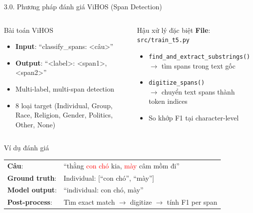 \documentclass[11pt, aspectratio=169]{beamer}
\begin{document}
\begin{frame}[shrink=8]{3.0. Phương pháp đánh giá ViHOS (Span Detection)}

\begin{columns}[T]
  \begin{block}{Bài toán ViHOS}
    \begin{itemize}
      \item \textbf{Input}: ``classify\_spans: <câu>''
      \item \textbf{Output}: ``<label>: <span1>, <span2>''
      \item Multi-label, multi-span detection
      \item 8 loại target (Individual, Group, Race, Religion, Gender, Politics, Other, None)
    \end{itemize}
  \end{block}

  \begin{block}{Hậu xử lý đặc biệt}
    \textbf{File}: \texttt{src/train\_t5.py}
    \begin{itemize}
      \item \texttt{find\_and\_extract\_substrings()}\\
        $\rightarrow$ tìm spans trong text gốc
      \item \texttt{digitize\_spans()}\\
        $\rightarrow$ chuyển text spans thành token indices
      \item So khớp F1 tại character-level
    \end{itemize}
  \end{block}
\end{columns}

\vspace{0.3cm}
\begin{block}{Ví dụ đánh giá}
  \centering
  \begin{tabular}{ll}
    \textbf{Câu}: & ``thằng \textcolor{red}{con chó} kia, \textcolor{red}{mày} câm mồm đi'' \\
    \textbf{Ground truth}: & Individual: [``con chó'', ``mày''] \\
    \textbf{Model output}: & ``individual: con chó, mày'' \\
    \textbf{Post-process}: & Tìm exact match $\rightarrow$ digitize $\rightarrow$ tính F1 per span \\
  \end{tabular}
\end{block}
\end{frame}
\end{document}
